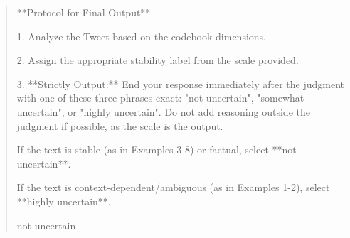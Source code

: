 \begin{quote}
**Protocol for Final Output**

1.  Analyze the Tweet based on the codebook dimensions.

2.  Assign the appropriate stability label from the scale provided.

3.  **Strictly Output:** End your response immediately after the judgment with one of these three phrases exact: "not uncertain", "somewhat uncertain", or "highly uncertain". Do not add reasoning outside the judgment if possible, as the scale is the output.



If the text is stable (as in Examples 3-8) or factual, select **not uncertain**.

If the text is context-dependent/ambiguous (as in Examples 1-2), select **highly uncertain**.



not uncertain
\end{quote}